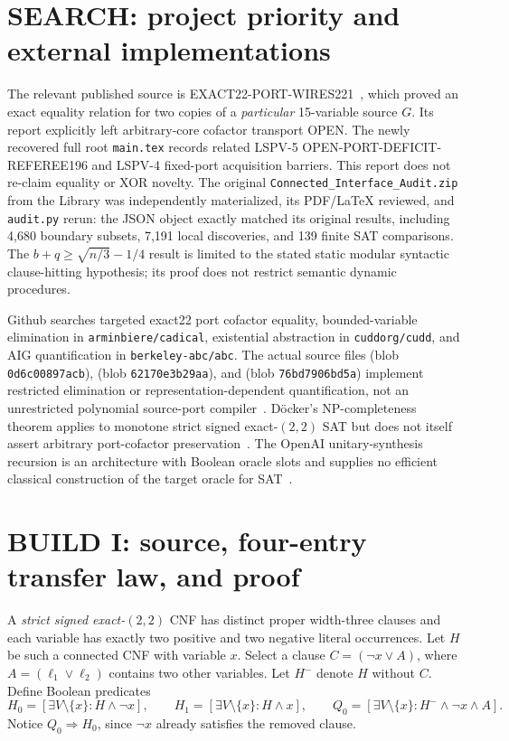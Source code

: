 \documentclass[11pt]{article}
\begin{document}
\section{SEARCH: project priority and external implementations}
The relevant published source is EXACT22-PORT-WIRES221~\cite{prior221}, which proved an exact equality relation for two copies of a \emph{particular} 15-variable source $G$. Its report explicitly left arbitrary-core cofactor transport OPEN. The newly recovered full root \texttt{main.tex} records related LSPV-5 OPEN-PORT-DEFICIT-REFEREE196 and LSPV-4 fixed-port acquisition barriers. This report does not re-claim equality or XOR novelty. The original \texttt{Connected\_Interface\_Audit.zip} from the Library was independently materialized, its PDF/LaTeX reviewed, and \texttt{audit.py} rerun: the JSON object exactly matched its original results, including 4,680 boundary subsets, 7,191 local discoveries, and 139 finite SAT comparisons. The $b+q\ge\sqrt{n/3}-1/4$ result is limited to the stated static modular syntactic clause-hitting hypothesis; its proof does not restrict semantic dynamic procedures.

Github searches targeted exact22 port cofactor equality, bounded-variable elimination in \texttt{arminbiere/cadical}, existential abstraction in \texttt{cuddorg/cudd}, and AIG quantification in \texttt{berkeley-abc/abc}. The actual source files  (blob \texttt{0d6c00897acb}),  (blob \texttt{62170e3b29aa}), and  (blob \texttt{76bd7906bd5a}) implement restricted elimination or representation-dependent quantification, not an unrestricted polynomial source-port compiler~\cite{cadical,cudd,abc}. D\"ocker's NP-completeness theorem applies to monotone strict signed exact-$(2,2)$ SAT but does not itself assert arbitrary port-cofactor preservation~\cite{docker2019,darmann2020}. The OpenAI unitary-synthesis recursion is an architecture with Boolean oracle slots and supplies no efficient classical construction of the target oracle for SAT~\cite{openai2026}.

\section{BUILD I: source, four-entry transfer law, and proof}
A \emph{strict signed exact-$(2,2)$} CNF has distinct proper width-three clauses and each variable has exactly two positive and two negative literal occurrences. Let $H$ be such a connected CNF with variable $x$. Select a clause $C=(\neg x\lor A)$, where $A=(\ell_1\lor\ell_2)$ contains two other variables. Let $H^{-}$ denote $H$ without $C$. Define Boolean predicates
\[
 H_0=\left[\exists V\setminus\{x\}:H\wedge\neg x\right],\qquad
 H_1=\left[\exists V\setminus\{x\}:H\wedge x\right],\qquad
 Q_0=\left[\exists V\setminus\{x\}:H^{-}\wedge\neg x\wedge A\right].
\]
Notice $Q_0\Rightarrow H_0$, since $\neg x$ already satisfies the removed clause.
\end{document}
